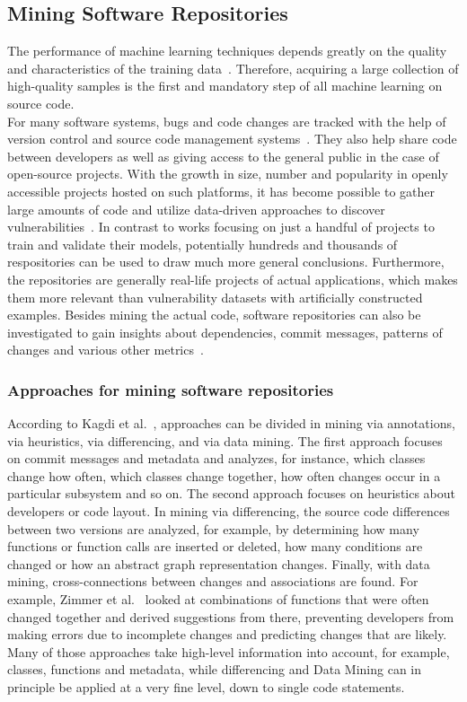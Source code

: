 \documentclass[
a4paper,
pagesize,
pdftex,
12pt,
twoside, %
BCOR=5mm, %
ngerman,
fleqn,
final,
]{scrartcl}
\begin{document}
	\subsection{Mining Software Repositories}\label{Mining-Software-Repositories}
	The performance of machine learning techniques depends greatly on the quality and characteristics of the training data~\cite{Pang.2015}. Therefore, acquiring a large collection of high-quality samples is the first and mandatory step of all machine learning on source code.\\
	For many software systems, bugs and code changes are tracked with the help of version control and source code management systems~\cite{Zhou.2017}. They also help share code between developers as well as giving access to the general public in the case of open-source projects. With the growth in size, number and popularity in openly accessible projects hosted on such platforms, it has become possible to gather large amounts of code and utilize data-driven approaches to discover vulnerabilities~\cite{Russell.2018}. In contrast to works focusing on just a handful of projects to train and validate their models, potentially hundreds and thousands of respositories can be used to draw much more general conclusions. Furthermore, the repositories are generally real-life projects of actual applications, which makes them more relevant than vulnerability datasets with artificially constructed examples. Besides mining the actual code, software repositories can also be investigated to gain insights about dependencies, commit messages, patterns of changes and various other metrics~\cite{Liu.2018}.\\
	\subsubsection{Approaches for mining software repositories}
	According to Kagdi et al.~\cite{Kagdi.2005}, approaches can be divided in mining via annotations, via heuristics, via differencing, and via data mining. The first approach focuses on commit messages and metadata and analyzes, for instance, which classes change how often, which classes change together, how often changes occur in a particular subsystem and so on. The second approach focuses on heuristics about developers or code layout. In mining via differencing, the source code differences between two versions are analyzed, for example, by determining how many functions or function calls are inserted or deleted, how many conditions are changed or how an abstract graph representation changes. Finally, with data mining, cross-connections between changes and associations are found. For example, Zimmer et al.~\cite{Zimmermann.2005} looked at combinations of functions that were often changed together and derived suggestions from there, preventing developers from making errors due to incomplete changes and predicting changes that are likely.\\
	Many of those approaches take high-level information into account, for example, classes, functions and metadata, while differencing and Data Mining can in principle be applied at a very fine level, down to single code statements.
\end{document}
